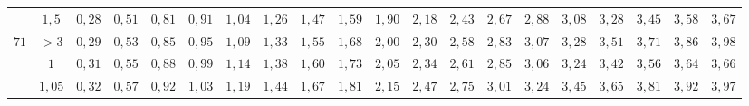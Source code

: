 \begin{table}[]
{\begin{tabular}{|c|c|c|c|c|c|c|c|c|c|c|c|c|c|c|c|c|c|c|c|}
                        & $1,5$                                                                               & \cellcolor[HTML]{FFCCC9}$0,28$ & \cellcolor[HTML]{FFCCC9}$0,51$ & \cellcolor[HTML]{FFCCC9}$0,81$ & \cellcolor[HTML]{FFCCC9}$0,91$ & \cellcolor[HTML]{FFCCC9}$1,04$ & \cellcolor[HTML]{FFCCC9}$1,26$ & \cellcolor[HTML]{FD6864}$1,47$ & \cellcolor[HTML]{FD6864}$1,59$ & \cellcolor[HTML]{FD6864}$1,90$ & \cellcolor[HTML]{FD6864}$2,18$ & \cellcolor[HTML]{FE0000}$2,43$ & \cellcolor[HTML]{FE0000}$2,67$ & \cellcolor[HTML]{FE0000}$2,88$                        & \cellcolor[HTML]{FE0000}$3,08$ & \cellcolor[HTML]{CB0000}$3,28$ & \cellcolor[HTML]{CB0000}$3,45$ & \cellcolor[HTML]{9A0000}$3,58$ & \cellcolor[HTML]{9A0000}$3,67$ \\ \cline{2-20} 
\multirow{-5}{*}{$71$}  & $>3$                                                                                & \cellcolor[HTML]{FFCCC9}$0,29$ & \cellcolor[HTML]{FFCCC9}$0,53$ & \cellcolor[HTML]{FFCCC9}$0,85$ & \cellcolor[HTML]{FFCCC9}$0,95$ & \cellcolor[HTML]{FFCCC9}$1,09$ & \cellcolor[HTML]{FFCCC9}$1,33$ & \cellcolor[HTML]{FD6864}$1,55$ & \cellcolor[HTML]{FD6864}$1,68$ & \cellcolor[HTML]{FD6864}$2,00$ & \cellcolor[HTML]{FD6864}$2,30$ & \cellcolor[HTML]{FE0000}$2,58$ & \cellcolor[HTML]{FE0000}$2,83$ & \cellcolor[HTML]{FE0000}$3,07$                        & \cellcolor[HTML]{FE0000}$3,28$ & \cellcolor[HTML]{CB0000}$3,51$ & \cellcolor[HTML]{CB0000}$3,71$ & \cellcolor[HTML]{9A0000}$3,86$ & \cellcolor[HTML]{9A0000}$3,98$ \\ \hline
                        & $1$                                                                                 & \cellcolor[HTML]{FFCCC9}$0,31$ & \cellcolor[HTML]{FFCCC9}$0,55$ & \cellcolor[HTML]{FFCCC9}$0,88$ & \cellcolor[HTML]{FFCCC9}$0,99$ & \cellcolor[HTML]{FFCCC9}$1,14$ & \cellcolor[HTML]{FD6864}$1,38$ & \cellcolor[HTML]{FD6864}$1,60$ & \cellcolor[HTML]{FD6864}$1,73$ & \cellcolor[HTML]{FD6864}$2,05$ & \cellcolor[HTML]{FE0000}$2,34$ & \cellcolor[HTML]{FE0000}$2,61$ & \cellcolor[HTML]{FE0000}$2,85$ & \cellcolor[HTML]{CB0000}$3,06$                        & \cellcolor[HTML]{CB0000}$3,24$ & \cellcolor[HTML]{CB0000}$3,42$ & \cellcolor[HTML]{9A0000}$3,56$ & \cellcolor[HTML]{9A0000}$3,64$ & \cellcolor[HTML]{F8A102}$3,66$ \\ \cline{2-20} 
                        & $1,05$                                                                              & \cellcolor[HTML]{FFCCC9}$0,32$ & \cellcolor[HTML]{FFCCC9}$0,57$ & \cellcolor[HTML]{FFCCC9}$0,92$ & \cellcolor[HTML]{FFCCC9}$1,03$ & \cellcolor[HTML]{FFCCC9}$1,19$ & \cellcolor[HTML]{FD6864}$1,44$ & \cellcolor[HTML]{FD6864}$1,67$ & \cellcolor[HTML]{FD6864}$1,81$ & \cellcolor[HTML]{FD6864}$2,15$ & \cellcolor[HTML]{FE0000}$2,47$ & \cellcolor[HTML]{FE0000}$2,75$ & \cellcolor[HTML]{FE0000}$3,01$ & \cellcolor[HTML]{CB0000}$3,24$                        & \cellcolor[HTML]{CB0000}$3,45$ & \cellcolor[HTML]{CB0000}$3,65$ & \cellcolor[HTML]{9A0000}$3,81$ & \cellcolor[HTML]{9A0000}$3,92$ & \cellcolor[HTML]{F8A102}$3,97$ \\ \cline{2-20} 

\end{tabular}}
\end{table}

